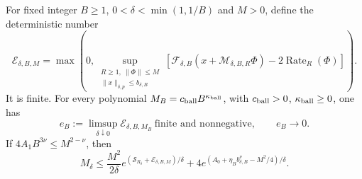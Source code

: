 \begin{proposition}
  \label{P:signed-moment-bulk-tail}
  For fixed integer $B\ge1$, $0<\delta<\min(1,1/B)$ and $M>0$,
  define the deterministic number
  \[
    \mathcal E_{\delta,B,M}=
    \max\left(0,\sup_{\substack{R\ge1,\ \|\Phi\|\le M\\
    \|x\|_{\delta,p}\le b_{\delta,B}}}
    [\mathcal F_{\delta,B}(x+\mathcal M_{\delta,B,R}\Phi)
    -2\operatorname{Rate}_R(\Phi)]\right).
  \]
  It is finite. For every polynomial
  $M_B=c_{\rm ball}B^{\kappa_{\rm ball}}$, with $c_{\rm ball}>0$,
  $\kappa_{\rm ball}\ge0$, one has
  \begin{equation}\label{E:signed-error-limit}
    e_B:=\limsup_{\delta\downarrow0}\mathcal E_{\delta,B,M_B}
    \ \text{finite and nonnegative},\qquad e_B\longrightarrow0 .
  \end{equation}
  If $4A_1B^{3\nu}\le M^{2-\nu}$, then
  \begin{equation}\label{E:signed-finite-moment}
    M_\delta\le
    \frac{M^2}{2\delta}
    e^{(\mathcal S_{R_\delta}+\mathcal E_{\delta,B,M})/\delta}
    +4e^{(A_0+\eta_Bb_{\delta,B}^\nu-M^2/4)/\delta}.
  \end{equation}
\end{proposition}

